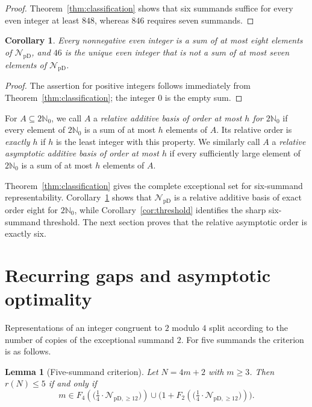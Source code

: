 \documentclass[12pt]{article}
\theoremstyle{plain}
\newtheorem{lemma}[theorem]{Lemma}
\newtheorem{corollary}[theorem]{Corollary}
\theoremstyle{definition}
\theoremstyle{plain}
\newcommand{\NpD}{\mathcal{N}_{\mathrm{pD}}}
\newcommand{\Pset}{%
  \bigl(\tfrac{1}{4}\cdot\mathcal{N}_{\mathrm{pD},\geq 12}\bigr)%
}
\begin{document}
\begin{proof}
Theorem~\ref{thm:classification} shows that six summands suffice for every even
integer at least $848$, whereas $846$ requires seven summands.
\end{proof}

\begin{corollary}\label{cor:eight}
Every nonnegative even integer is a sum of at most eight elements of
$\NpD$, and $46$ is the unique even integer that is not a sum of at most
seven elements of $\NpD$.
\end{corollary}

\begin{proof}
The assertion for positive integers follows immediately from
Theorem~\ref{thm:classification}; the integer $0$ is the empty sum.
\end{proof}


For $A\subseteq2\mathbb N_0$, we call $A$ a \emph{relative additive basis of
order at most $h$ for $2\mathbb N_0$} if every element of $2\mathbb N_0$ is a
sum of at most $h$ elements of $A$.  Its relative order is \emph{exactly $h$}
if $h$ is the least integer with this property.  We similarly call $A$ a
\emph{relative asymptotic additive basis of order at most $h$} if every
sufficiently large element of $2\mathbb N_0$ is a sum of at most $h$ elements
of $A$.

Theorem~\ref{thm:classification} gives the complete exceptional set for
six-summand representability.  Corollary~\ref{cor:eight} shows that $\NpD$ is
a relative additive basis of exact order eight for $2\mathbb N_0$, while
Corollary~\ref{cor:threshold} identifies the sharp six-summand threshold.
The next section proves that the relative asymptotic order is exactly six.


\section{Recurring gaps and asymptotic optimality}\label{sec:asymptotic}

Representations of an integer congruent to $2$ modulo $4$ split according to
the number of copies of the exceptional summand $2$.  For five summands the
criterion is as follows.

\begin{lemma}[Five-summand criterion]\label{lem:fivecrit}
Let $N=4m+2$ with $m\geq3$.  Then $r(N)\leq5$ if and only if
\begin{equation}\label{eq:fivecrit}
  m\in F_4(\Pset)\cup\bigl(1+F_2(\Pset)\bigr).
\end{equation}
\end{lemma}
\end{document}

